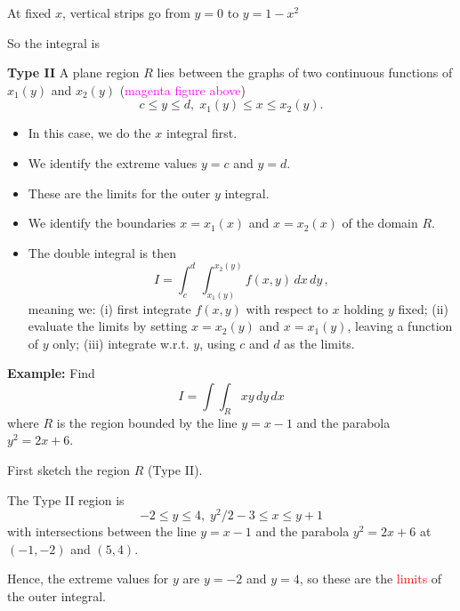 \documentclass{article}
\begin{document}
At fixed $x$, vertical strips go from $y=0$ to $y=1-x^2$

So the integral is

\vskip 5cm

%

\textbf{Type II} A plane region $R$ lies between the
graphs of two continuous functions of $x_1(y)$ and $x_2 (y)$ (\textcolor{magenta}{magenta figure above})
$$ 
c \le y \le d,\;  x_1(y) \le x \le x_2(y). 
$$
\vspace{-.8cm}

\begin{itemize}
\item
In this case, we do the $x$ integral first.
\item
We identify the extreme values $y=c$ and $y=d$. 
\item
These are the limits for the outer $y$ integral. 
\item
We identify the boundaries $x=x_1(x)$ and $x=x_2(x)$ of the domain $R$.
\item
The double integral is then
$$ 
I= \int_c^d \, \int_{x_1(y)}^{x_2(y)} f(x,y) \, dx \, dy\,, 
$$
meaning we: (i) first integrate $f(x,y)$ with respect to $x$ holding
$y$ fixed; (ii) evaluate the limits by setting $x=x_2(y)$ and
$x=x_1(y)$, leaving a function of $y$ only; (iii) integrate w.r.t. $y$, using $c$ and $d$ as the limits.
\end{itemize}

%


\textbf{\bf Example:} Find
$$  
I = \int \int_R xy \, dy \, dx 
$$
where $R$ is the region bounded by the line  $y=x-1$ and the
parabola $y^2=2x+6$.

First sketch the region $R$ (Type II).
\vskip 5cm


 The Type II region is
$$ 
-2 \le y \le 4,\;  y^2/2-3 \le x \le y+1
$$
with intersections between the line $y=x-1$ and the
parabola $y^2=2x+6$ at $(-1,-2)$ and $(5,4).$

Hence, the extreme values for $y$ are $y=-2$ and $y=4$, so these
are the \textcolor{red}{limits} of the outer integral. 
\end{document}
